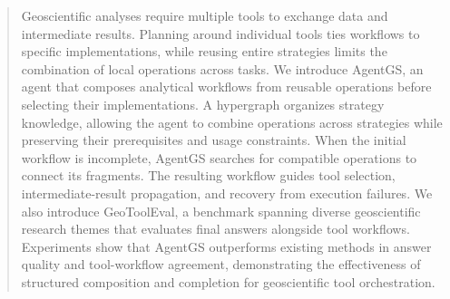 \begin{abstract}
Geoscientific analyses require multiple tools to exchange data and intermediate results. Planning around individual tools ties workflows to specific implementations, while reusing entire strategies limits the combination of local operations across tasks. We introduce AgentGS, an agent that composes analytical workflows from reusable operations before selecting their implementations. A hypergraph organizes strategy knowledge, allowing the agent to combine operations across strategies while preserving their prerequisites and usage constraints. When the initial workflow is incomplete, AgentGS searches for compatible operations to connect its fragments. The resulting workflow guides tool selection, intermediate-result propagation, and recovery from execution failures. We also introduce GeoToolEval, a benchmark spanning diverse geoscientific research themes that evaluates final answers alongside tool workflows. Experiments show that AgentGS outperforms existing methods in answer quality and tool-workflow agreement, demonstrating the effectiveness of structured composition and completion for geoscientific tool orchestration.
\end{abstract}
